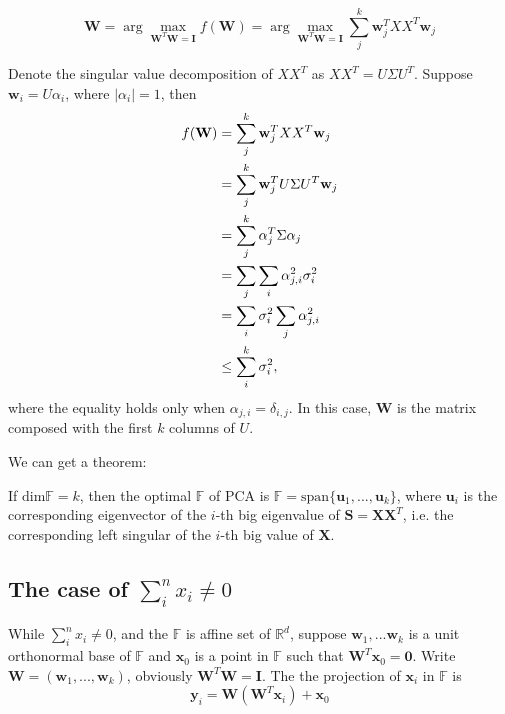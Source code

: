 	\begin{equation}
	\mathbf W=\arg\max_{\mathbf W^T\mathbf W=\mathbf I}f(\mathbf W)=\arg\max_{\mathbf W^T\mathbf W=\mathbf I}\sum_j^k \mathbf w_j^T XX^T \mathbf w_j
	\end{equation}
	
Denote the singular value decomposition of $XX^T$ as $XX^T=U\Sigma U^T$. Suppose $\mathbf w_i=U \alpha_i$, where $|\alpha_i|=1$, then 
	\begin{align}
	f(\mathbf W)&=\sum_j^k \mathbf w_j^T XX^T \mathbf w_j\\\notag
	&=\sum_j^k \mathbf w_j^T U\Sigma U^T \mathbf w_j\\\notag
    &=\sum_j^k \mathbf \alpha_j^T \Sigma \alpha_j\\\notag
    &=\sum_j \sum_i \mathbf \alpha_{j,i}^2 \sigma_i^2 \\\notag
    &=\sum_i \sigma_i^2 \sum_j \mathbf \alpha_{j,i}^2  \\\notag
    &\leq\sum_i^k \sigma_i^2,
	\end{align}	
	where the equality holds only when $\alpha_{j,i}=\delta_{i,j}$. In this case, $\mathbf W$ is the matrix composed with the first $k$ columns of $U$. 
	
	We can get a theorem:
	\begin{theorem}\label{theorem:PCA}
		If $\text{dim}\mathbb F = k$, then the optimal $\mathbb F$ of PCA is $\mathbb F= \text{span}\{\mathbf u_1,...,\mathbf u_k \}$, where $\mathbf u_i$ is the corresponding eigenvector of the $i$-th big eigenvalue of $\mathbf S=\mathbf X\mathbf X^T$, i.e. the corresponding left singular of the $i$-th big value of $\mathbf X$. 
	\end{theorem}
	
	\subsection{The case of $\sum_i^n x_i\neq 0$}
	While $\sum_i^n x_i\neq 0$, and the $\mathbb F$ is affine set of $\mathbb R^d$, suppose $\mathbf w_1,...\mathbf w_k$ is a unit orthonormal base of $\mathbb F$ and $\mathbf x_0$ is a point in $\mathbb F$ such that $\mathbf W^T\mathbf x_0 =\mathbf 0$. Write $\mathbf{W}=(\mathbf{w}_1,...,\mathbf{w}_k)$, obviously $\mathbf W^T\mathbf W=\mathbf I$. The the projection of $\mathbf x_i$ in $\mathbb F$ is
	\begin{equation}
		\mathbf y_i=\mathbf W(\mathbf W^T\mathbf x_i)+\mathbf x_0
	\end{equation}
	

